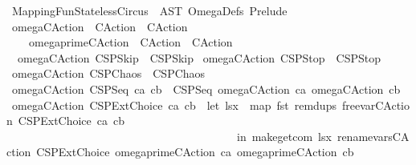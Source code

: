 %
\begin{isabellebody}%
%
%
\isamarkuptrue%
%
\isadelimtheory
%
\endisadelimtheory
%
\isatagtheory
{}\isamarkupfalse%
\ MappingFunStatelessCircus\ \ AST\ OmegaDefs\ Prelude\ %
\endisatagtheory
{\isafoldtheory}%
%
\isadelimtheory
%
\endisadelimtheory
\isanewline
\ \isanewline
{}\isamarkupfalse%
\ omega{\isacharunderscore}CAction\ {\isacharcolon}{\isacharcolon}\ {\isachardoublequoteopen}CAction\ {\isasymRightarrow}\ CAction{\isachardoublequoteclose}\ \ \isanewline
\ \ \ \ omega{\isacharunderscore}prime{\isacharunderscore}CAction\ {\isacharcolon}{\isacharcolon}\ {\isachardoublequoteopen}CAction\ {\isasymRightarrow}\ CAction{\isachardoublequoteclose}\isanewline
{}\isanewline
\ \ {\isachardoublequoteopen}omega{\isacharunderscore}CAction\ CSPSkip\ {\isacharequal}\ CSPSkip{\isachardoublequoteclose}\isanewline
{\isacharbar}\ {\isachardoublequoteopen}omega{\isacharunderscore}CAction\ CSPStop\ {\isacharequal}\ CSPStop{\isachardoublequoteclose}\isanewline
{\isacharbar}\ {\isachardoublequoteopen}omega{\isacharunderscore}CAction\ CSPChaos\ {\isacharequal}\ CSPChaos{\isachardoublequoteclose}\isanewline
{\isacharbar}\ {\isachardoublequoteopen}omega{\isacharunderscore}CAction\ {\isacharparenleft}CSPSeq\ ca\ cb{\isacharparenright}\ {\isacharequal}\ {\isacharparenleft}CSPSeq\ {\isacharparenleft}omega{\isacharunderscore}CAction\ ca{\isacharparenright}\ {\isacharparenleft}omega{\isacharunderscore}CAction\ cb{\isacharparenright}{\isacharparenright}{\isachardoublequoteclose}\isanewline
{\isacharbar}\ {\isachardoublequoteopen}omega{\isacharunderscore}CAction\ {\isacharparenleft}CSPExtChoice\ ca\ cb{\isacharparenright}\ {\isacharequal}\ {\isacharparenleft}let\ lsx\ {\isacharequal}\ {\isacharparenleft}map\ fst\ {\isacharparenleft}remdups\ {\isacharparenleft}free{\isacharunderscore}var{\isacharunderscore}CAction\ {\isacharparenleft}CSPExtChoice\ ca\ cb{\isacharparenright}{\isacharparenright}{\isacharparenright}{\isacharparenright}\isanewline
\ \ \ \ \ \ \ \ \ \ \ \ \ \ \ \ \ \ \ \ \ \ \ \ \ \ \ \ \ \ \ \ \ \ \ \ \ \ \ \ \ in\ make{\isacharunderscore}get{\isacharunderscore}com\ lsx\ {\isacharparenleft}rename{\isacharunderscore}vars{\isacharunderscore}CAction\ {\isacharparenleft}CSPExtChoice\ {\isacharparenleft}omega{\isacharunderscore}prime{\isacharunderscore}CAction\ ca{\isacharparenright}\ {\isacharparenleft}omega{\isacharunderscore}prime{\isacharunderscore}CAction\ cb{\isacharparenright}{\isacharparenright}{\isacharparenright}{\isacharparenright}{\isachardoublequoteclose}\isanewline

\end{isabellebody}
